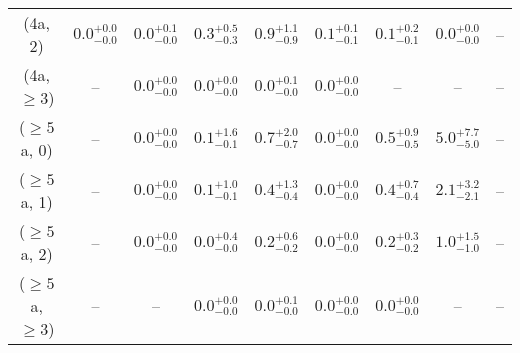 \begin{table}[h!]
{\begin{tabular}{ccccccccc}
	(4a, 2) & $0.0^{+ 0.0 }_{- 0.0 }$ & $0.0^{+ 0.1 }_{- 0.0 }$ & $0.3^{+ 0.5 }_{- 0.3 }$ & $0.9^{+ 1.1 }_{- 0.9 }$ & $0.1^{+ 0.1 }_{- 0.1 }$ & $0.1^{+ 0.2 }_{- 0.1 }$ & $0.0^{+ 0.0 }_{- 0.0 }$ & -- \\[0.5ex] 
	(4a, $\ge3$) & -- & $0.0^{+ 0.0 }_{- 0.0 }$ & $0.0^{+ 0.0 }_{- 0.0 }$ & $0.0^{+ 0.1 }_{- 0.0 }$ & $0.0^{+ 0.0 }_{- 0.0 }$ & -- & -- & -- \\[0.5ex] 
	($\ge5$a, 0) & -- & $0.0^{+ 0.0 }_{- 0.0 }$ & $0.1^{+ 1.6 }_{- 0.1 }$ & $0.7^{+ 2.0 }_{- 0.7 }$ & $0.0^{+ 0.0 }_{- 0.0 }$ & $0.5^{+ 0.9 }_{- 0.5 }$ & $5.0^{+ 7.7 }_{- 5.0 }$ & -- \\[0.5ex] 
	($\ge5$a, 1) & -- & $0.0^{+ 0.0 }_{- 0.0 }$ & $0.1^{+ 1.0 }_{- 0.1 }$ & $0.4^{+ 1.3 }_{- 0.4 }$ & $0.0^{+ 0.0 }_{- 0.0 }$ & $0.4^{+ 0.7 }_{- 0.4 }$ & $2.1^{+ 3.2 }_{- 2.1 }$ & -- \\[0.5ex] 
	($\ge5$a, 2) & -- & $0.0^{+ 0.0 }_{- 0.0 }$ & $0.0^{+ 0.4 }_{- 0.0 }$ & $0.2^{+ 0.6 }_{- 0.2 }$ & $0.0^{+ 0.0 }_{- 0.0 }$ & $0.2^{+ 0.3 }_{- 0.2 }$ & $1.0^{+ 1.5 }_{- 1.0 }$ & -- \\[0.5ex] 
	($\ge5$a, $\ge3$) & -- & -- & $0.0^{+ 0.0 }_{- 0.0 }$ & $0.0^{+ 0.1 }_{- 0.0 }$ & $0.0^{+ 0.0 }_{- 0.0 }$ & $0.0^{+ 0.0 }_{- 0.0 }$ & -- & -- \\[0.5ex] 
	\hline
	\hline
\end{tabular}}
\end{table}
